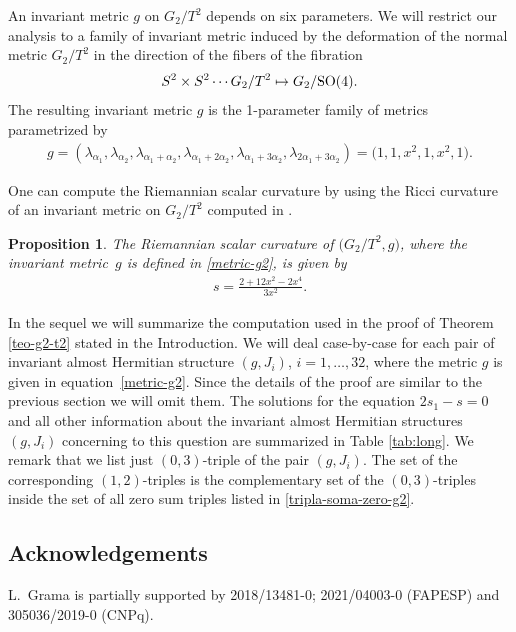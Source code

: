 \documentclass[pdftex]{sigma}%
\numberwithin{equation}{section}
\newtheorem{Proposition}[Theorem]{Proposition}
 { \theoremstyle{definition}
\newtheorem{Definition}[Theorem]{Definition}
\newtheorem{Question}[Theorem]{Question}
\newtheorem*{Notation}{Notation}
\newtheorem{Example}[Theorem]{Example}
\newtheorem{Remark}[Theorem]{Remark} }
\begin{document}
An invariant metric $g$ on $G_2/T^2$ depends on six parameters. We will restrict our analysis to a family of invariant metric induced by the deformation of the normal metric $G_2/T^2$ in the direction of the fibers of the fibration
\begin{gather}
S^2\times S^2  \cdots G_2/T^2  \mapsto G_2/{\rm SO}(4).
\end{gather}
The resulting invariant metric $g$ is the 1-parameter family of metrics parametrized by
\begin{gather} \label{metric-g2}
g=(\lambda_{\alpha_{1}},\lambda_{\alpha_{2}},\lambda_{\alpha_{1}+\alpha_{2}}, \lambda_{\alpha_{1}+2\alpha_{2}},\lambda_{\alpha_{1}+3\alpha_{2}},\lambda_{2\alpha_{1}+3\alpha_{2}})= \big(1,1,x^{2},1,x^{2},1\big).
 \end{gather}

One can compute the Riemannian scalar curvature by using the Ricci curvature of an invariant metric on $G_2/T^2$ computed in \cite{AC-g2}.
\begin{Proposition}
The Riemannian scalar curvature of $\big(G_2/T^2,g\big)$, where the invariant metric~$g$ is defined in \eqref{metric-g2}, is given by
\begin{gather*}
s= \frac{2+12x^2-2x^4}{3x^2}.
\end{gather*}
\end{Proposition}

In the sequel we will summarize the computation used in the proof of Theorem \ref{teo-g2-t2} stated in the Introduction. We will deal case-by-case for each pair of invariant almost Hermitian structure $(g,J_i)$, $i=1,\ldots, 32$, where the metric $g$ is given in equation~\eqref{metric-g2}. Since the details of the proof are similar to the previous section we will omit them. The solutions for the equation $2s_1-s=0$ and all other information about the invariant almost Hermitian structures $(g,J_i)$ concerning to this question are summarized in Table \ref{tab:long}. We remark that we list just $(0,3)$-triple of the pair $(g,J_i)$. The set of the corresponding $(1,2)$-triples is the complementary set of the $(0,3)$-triples inside the set of all zero sum triples listed in \eqref{tripla-soma-zero-g2}.

\subsection*{Acknowledgements}
L.~Grama is partially supported by 2018/13481-0; 2021/04003-0 (FAPESP) and 305036/2019-0 (CNPq).
\end{document}
